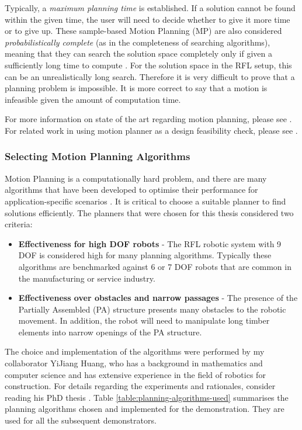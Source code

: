Typically, a \textit{maximum planning time} is established. If a solution cannot be found within the given time, the user will need to decide whether to give it more time or to give up. These sample-based Motion Planning (MP) are also considered \textit{probabilistically complete} (as in the completeness of searching algorithms), meaning that they can search the solution space completely only if given a sufficiently long time to compute \parencite{lavallePlanningAlgorithms2006}. For the solution space in the RFL setup, this can be an unrealistically long search. Therefore it is very difficult to prove that a planning problem is impossible. It is more correct to say that a motion is infeasible given the amount of computation time.

For more information on state of the art regarding motion planning, please see \cite{garrettIntegratedTaskMotion2021}. For related work in using motion planner as a design feasibility check, please see \cite{gandiaAutomaticPathPlanning2018}. 

\subsubsection{Selecting Motion Planning Algorithms}
\label{subsubsection:exploration-2-selecting-motion-planning-algorithms}

Motion Planning is a computationally hard problem, and there are many algorithms that have been developed to optimise their performance for application-specific scenarios \parencite{lavallePlanningAlgorithms2006}. It is critical to choose a suitable planner to find solutions efficiently. The planners that were chosen for this thesis considered two criteria:
\begin{itemize}
    \item \textbf{Effectiveness for high DOF robots} - The RFL robotic system with 9 DOF is considered high for many planning algorithms. Typically these algorithms are benchmarked against 6 or 7 DOF robots that are common in the manufacturing or service industry.
    \item \textbf{Effectiveness over obstacles and narrow passages} - The presence of the Partially Assembled (PA) structure presents many obstacles to the robotic movement. In addition, the robot will need to manipulate long timber elements into narrow openings of the PA structure.
\end{itemize}

The choice and implementation of the algorithms were performed by my collaborator YiJiang Huang, who has a background in mathematics and computer science and has extensive experience in the field of robotics for construction.  For details regarding the experiments and rationales, consider reading his PhD thesis \parencite{huangAlgorithmicPlanningRobotic2022}. Table \ref{table:planning-algorithms-used} summarises the planning algorithms chosen and implemented for the demonstration. They are used for all the subsequent demonstrators.

